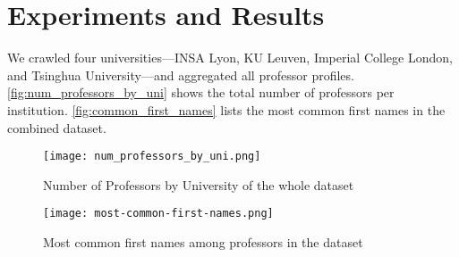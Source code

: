 \section{Experiments and Results}

We crawled four universities—INSA Lyon, KU Leuven, Imperial College London, and Tsinghua University—and aggregated all professor profiles. \autoref{fig:num_professors_by_uni} shows the total number of professors per institution. \autoref{fig:common_first_names} lists the most common first names in the combined dataset.

\begin{figure}[ht]
    \centering
    \texttt{[image: num\_professors\_by\_uni.png]}
    \caption{Number of Professors by University of the whole dataset}
    \label{fig:num_professors_by_uni}
\end{figure}

\begin{figure}[ht]
    \centering
    \texttt{[image: most-common-first-names.png]}
    \caption{Most common first names among professors in the dataset}
    \label{fig:common_first_names}
\end{figure}
